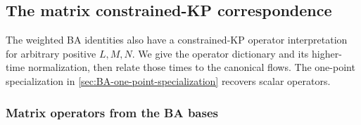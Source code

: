 \subsection{The matrix constrained-KP correspondence}
\label{sec:BA-constrained-KP}

The weighted BA identities also have a constrained-KP operator
interpretation for arbitrary positive $L,M,N$. We give the operator
dictionary and its higher-time normalization, then relate those times
to the canonical flows. The one-point specialization in
\cref{sec:BA-one-point-specialization} recovers scalar operators.

\subsubsection{Matrix operators from the BA bases}

